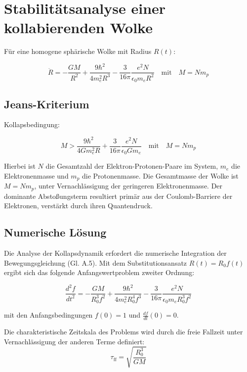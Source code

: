 \section{Stabilitätsanalyse einer kollabierenden Wolke}
Für eine homogene sphärische Wolke mit Radius $R(t)$:

\begin{equation}
    \ddot{R} = -\frac{G M}{R^2} + \frac{9 \hbar^2}{4 m_e^2 R^3} - \frac{3}{16\pi} \frac{e^2 N}{\epsilon_0 m_e R^2}
    \quad \text{mit} \quad M = N m_p
\end{equation}

\subsection{Jeans-Kriterium}
Kollapsbedingung:

\begin{equation}
    M > \frac{9 \hbar^2}{4 G m_e^2 R} + \frac{3}{16\pi} \frac{e^2 N}{\epsilon_0 G m_e}
    \quad \text{mit} \quad M = N m_p
\end{equation}

Hierbei ist $N$ die Gesamtzahl der Elektron-Protonen-Paare im System, $m_e$ die Elektronenmasse und $m_p$ die Protonenmasse. Die Gesamtmasse der Wolke ist $M = N m_p$, unter Vernachlässigung
der geringeren Elektronenmasse. Der dominante Abstoßungsterm resultiert primär aus der Coulomb-Barriere der Elektronen, verstärkt durch ihren Quantendruck.

\subsection{Numerische Lösung}
Die Analyse der Kollapsdynamik erfordert die numerische Integration der Bewegungsgleichung (Gl. A.5). Mit dem Substitutionsansatz $R(t) = R_0 f(t)$ ergibt sich das folgende
Anfangswertproblem zweiter Ordnung:

\begin{equation}
\label{eq:corrected_dimensionless}
\frac{d^{2}f}{dt^{2}} = -\frac{G M}{R_{0}^{3} f^{2}} + \frac{9 \hbar^{2}}{4 m_e^{2} R_{0}^{4} f^{3}} - \frac{3}{16\pi} \frac{e^{2} N}{\epsilon_{0} m_e R_{0}^{3} f^{2}}
\end{equation}

\noindent mit den Anfangsbedingungen $f(0) = 1$ und $\frac{df}{dt}(0) = 0$.

Die charakteristische Zeitskala des Problems wird durch die freie Fallzeit unter Vernachlässigung der anderen Terme definiert:
\[
\tau_{\text{ff}} = \sqrt{\frac{R_0^3}{G M}}
\]

